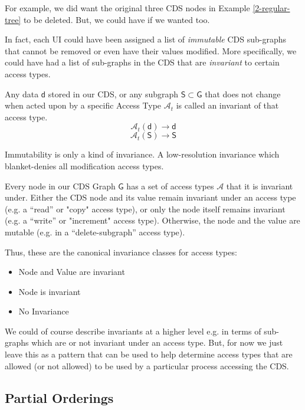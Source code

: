 For example, we did want the original three CDS nodes in Example \ref{2-regular-tree} to be deleted. But, we could have if we wanted too.

In fact, each UI could have been assigned a list of \textit{immutable} CDS sub-graphs that cannot be removed or even have their values modified. More specifically, we could have had a list of sub-graphs in the CDS that are \textit{invariant} to certain access types.

\begin{con-def}[Invariants]
	\label{invariants}
	Any data $\mathsf{d}$ stored in our CDS, or any subgraph $\mathsf{S} \subset \mathsf{G}$ that does not change when acted upon by a specific Access Type $\mathcal{A}_{t}$ is called an invariant of that access type.
	\[ \mathcal{A}_{t}\mathsf{(d)} \rightarrow \mathsf{d} \]
	\[ \mathcal{A}_{t}\mathsf{(S)} \rightarrow \mathsf{S} \]
\end{con-def}

\begin{con-aside}
Immutability is only a kind of invariance. A low-resolution invariance which blanket-denies all modification access types.
\end{con-aside}

Every node in our CDS Graph $\mathsf{G}$ has a set of access types $\mathcal{A}$ that it is invariant under. Either the CDS node and its value remain invariant under an access type (e.g. a ``read'' or "copy" access type), or only the node itself remains invariant (e.g. a ``write'' or "increment" access type). Otherwise, the node and the value are mutable (e.g. in a ``delete-subgraph'' access type).

Thus, these are the canonical invariance classes for access types:

\begin{itemize}
	\item Node and Value are invariant
	\item Node is invariant
	\item No Invariance 
\end{itemize}

We could of course describe invariants at a higher level e.g. in terms of sub-graphs which are or not invariant under an access type. But, for now we just leave this as a pattern that can be used to help determine access types that are allowed (or not allowed) to be used by a particular process accessing the CDS.


\subsection{Partial Orderings}

